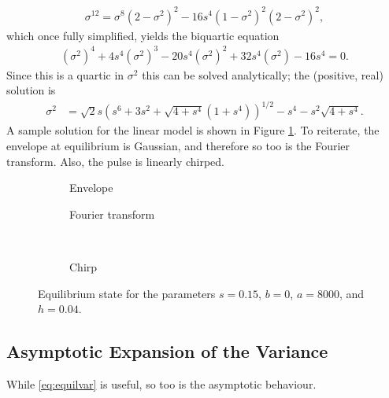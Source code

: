 \begin{align*}
\sigma^{12} = \sigma^8 (2 - \sigma^2)^2 - 16s^4 (1 - \sigma^2)^2 (2 - \sigma^2)^2,
\end{align*}
which once fully simplified, yields the biquartic equation
\begin{align}
\label{eq:var}
\left( \sigma^2 \right)^4 + 4 s^4 \left( \sigma^2 \right)^3 - 20 s^4 \left( \sigma^2 \right)^2 + 32 s^4 \left( \sigma^2 \right) - 16 s^4 = 0.
\end{align}
Since this is a quartic in $\sigma^2$ this can be solved analytically; the (positive, real) solution is
\begin{align}
\label{eq:equilvar}
\sigma^2 &= \sqrt{2} s \left( s^6 + 3s^2 + \sqrt{4 + s^4} \left( 1 + s^4 \right) \right)^{1/2} - s^4 - s^2 \sqrt{4 + s^4}.
\end{align}
A sample solution for the linear model is shown in Figure \ref{fig:linear}. To reiterate, the envelope at equilibrium is Gaussian, and therefore so too is the Fourier transform. Also, the pulse is linearly chirped. \\

\begin{figure}[tbp]
\centering
\begin{subfigure}{0.5\textwidth}
\centering

\caption{Envelope}
\end{subfigure}%
\begin{subfigure}{0.5\textwidth}
\centering

\caption{Fourier transform}
\end{subfigure} \\
\begin{subfigure}{0.5\textwidth}
\centering

\caption{Chirp}
\end{subfigure}
\caption[Envelope, Fourier transform, and chirp of the pulse---linear case.]{Equilibrium state for the parameters $s = 0.15$, $b = 0$, $a = 8000$, and $h = 0.04$.}
\label{fig:linear}
\end{figure}

\subsection{Asymptotic Expansion of the Variance}
While \eqref{eq:equilvar} is useful, so too is the asymptotic behaviour.


